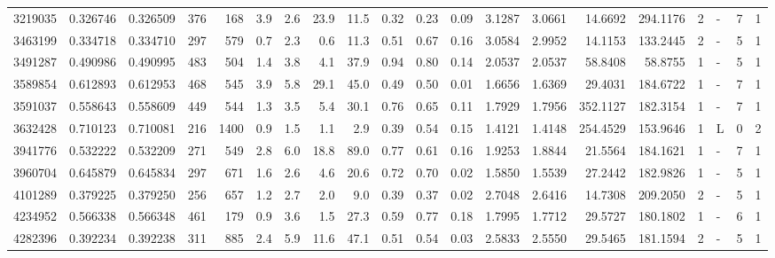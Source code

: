 \begin{tabular}{rrrrrrrrrrrrrrrrrlrl}
   3219035 & 0.326746 & 0.326509 &  376 &  168 &      3.9 &      2.6 &    23.9 &    11.5 &   0.32 &   0.23 &       0.09 &  3.1287 &  3.0661 &   14.6692 &  294.1176 &       2 &             - &        7 &         1 \\
   3463199 & 0.334718 & 0.334710 &  297 &  579 &      0.7 &      2.3 &     0.6 &    11.3 &   0.51 &   0.67 &       0.16 &  3.0584 &  2.9952 &   14.1153 &  133.2445 &       2 &             - &        5 &         1 \\
   3491287 & 0.490986 & 0.490995 &  483 &  504 &      1.4 &      3.8 &     4.1 &    37.9 &   0.94 &   0.80 &       0.14 &  2.0537 &  2.0537 &   58.8408 &   58.8755 &       1 &             - &        5 &         1 \\
   3589854 & 0.612893 & 0.612953 &  468 &  545 &      3.9 &      5.8 &    29.1 &    45.0 &   0.49 &   0.50 &       0.01 &  1.6656 &  1.6369 &   29.4031 &  184.6722 &       1 &             - &        7 &         1 \\
   3591037 & 0.558643 & 0.558609 &  449 &  544 &      1.3 &      3.5 &     5.4 &    30.1 &   0.76 &   0.65 &       0.11 &  1.7929 &  1.7956 &  352.1127 &  182.3154 &       1 &             - &        7 &         1 \\
   3632428 & 0.710123 & 0.710081 &  216 & 1400 &      0.9 &      1.5 &     1.1 &     2.9 &   0.39 &   0.54 &       0.15 &  1.4121 &  1.4148 &  254.4529 &  153.9646 &       1 &             L &        0 &         2 \\
   3941776 & 0.532222 & 0.532209 &  271 &  549 &      2.8 &      6.0 &    18.8 &    89.0 &   0.77 &   0.61 &       0.16 &  1.9253 &  1.8844 &   21.5564 &  184.1621 &       1 &             - &        7 &         1 \\
   3960704 & 0.645879 & 0.645834 &  297 &  671 &      1.6 &      2.6 &     4.6 &    20.6 &   0.72 &   0.70 &       0.02 &  1.5850 &  1.5539 &   27.2442 &  182.9826 &       1 &             - &        5 &         1 \\
   4101289 & 0.379225 & 0.379250 &  256 &  657 &      1.2 &      2.7 &     2.0 &     9.0 &   0.39 &   0.37 &       0.02 &  2.7048 &  2.6416 &   14.7308 &  209.2050 &       2 &             - &        5 &         1 \\
   4234952 & 0.566338 & 0.566348 &  461 &  179 &      0.9 &      3.6 &     1.5 &    27.3 &   0.59 &   0.77 &       0.18 &  1.7995 &  1.7712 &   29.5727 &  180.1802 &       1 &             - &        6 &         1 \\
   4282396 & 0.392234 & 0.392238 &  311 &  885 &      2.4 &      5.9 &    11.6 &    47.1 &   0.51 &   0.54 &       0.03 &  2.5833 &  2.5550 &   29.5465 &  181.1594 &       2 &             - &        5 &         1 \\

\end{tabular}
